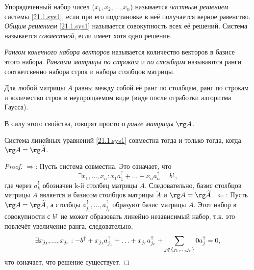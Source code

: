 \begin{defn}
Упорядоченный набор чисел ($x_1, x_2, \ldots, x_n$) называется \textit{частным решением} системы \eqref{21.1.sys1}, если при его подстановке в неё получается верное равенство. \textit{Общим решением} \eqref{21.1.sys1} называется совокупность всех её решений. Система называется \textit{совместной}, если имеет хотя одно решение.
\end{defn}
\begin{defn}
\textit{Рангом конечного набора векторов} называется количество векторов в базисе этого набора. \textit{Рангами матрицы по строкам} и \textit{по столбцам} называются ранги соответсвенно набора строк и набора столбцов матрицы.
\end{defn}
\begin{lemm} 
Для любой матрицы $A$ равны между собой её ранг по столбцам, ранг по строкам и количество строк в неупрощаемом виде (виде после отработки алгоритма Гаусса).
\end{lemm}
В силу этого свойства, говорят просто о \textit{ранге матрицы} $\rg A$.
\begin{thm}
Система линейных уравнений \eqref{21.1.sys1} совместна тогда и только тогда, когда $\rg A = \rg \widetilde A$.
\end{thm}
\begin{proof}
$\Rightarrow$: Пусть система совместна. Это означает, что
\begin{equation*}
\exists x_1,\ldots, x_n: x_1a_1^\uparrow +\ldots+x_na_n^\uparrow=b^\uparrow,
\end{equation*}
где через $a_k^\uparrow$ обозначен k-й столбец матрицы $A$. Следовательно, базис столбцов матрицы $A$  является и базисом столбцов матрицы $\widetilde A$ и $\rg A = \rg \widetilde A$.
$\Leftarrow$: Пусть $\rg A = \rg \widetilde A$, а столбцы $a_{j_1}^\uparrow,...,a_{j_r}^\uparrow$ образуют базис матрицы $A$. Этот набор в совокупности с $b^\uparrow$ не может образовать линейно независимый набор, т.к. это повлечёт увеличение ранга, следовательно, 
\begin{equation*}\\ 
\exists x_{j_1},...,x_{j_r}: -b^\uparrow+x_{j_1}a_{j_1}^\uparrow+\ldots+x_{j_r}a_{j_r}^\uparrow+\sum_{j \notin \{j_1,...,j_r\}}0 a_j^\uparrow = 0,
\end{equation*} 
что означает, что решение существует.
\end{proof}
